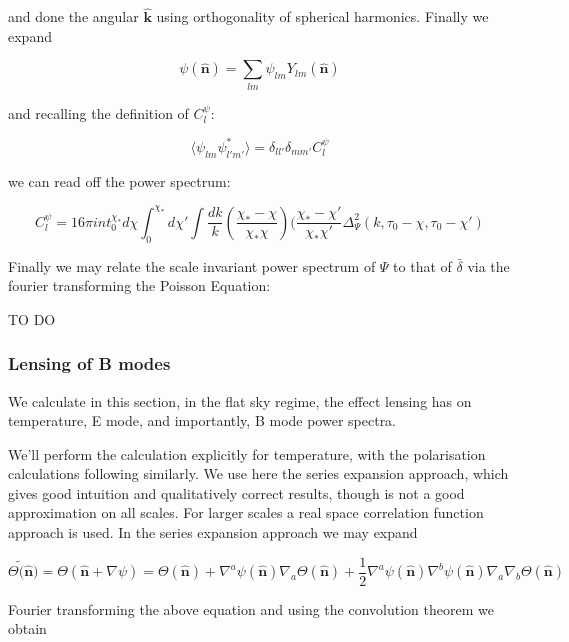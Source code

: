\documentclass[a4paper,10pt]{article}
\renewcommand{\v}[1]{\mathbf{#1}}
\newcommand{\half}{\frac{1}{2}}
\newcommand{\unit}[1]{\hat{\v{#1}}}
\begin{document}
and done the angular $\unit{k}$ using orthogonality of spherical harmonics. Finally we expand

\begin{equation}
\psi(\unit{n}) = \sum_{lm}\psi_{lm}Y_{lm}(\unit{n})
\end{equation}

and recalling the definition of $C_l^\psi$:

\begin{equation}
\langle \psi_{lm}\psi_{l'm'}^* \rangle = \delta_{ll'}\delta_{mm'}C_l^\psi
\end{equation}

we can read off the power spectrum:

\begin{equation}
C_l^\psi = 16\pi int_0^{\chi_*} d\chi \int_0^{\chi_*} d\chi' \int \frac{dk}{k} (\frac{\chi_*-\chi}{\chi_*\chi})(\frac{\chi_*-\chi'}{\chi_*\chi'}\Delta^2_\Psi(k, \tau_0-\chi, \tau_0-\chi')
\end{equation}

Finally we may relate the scale invariant power spectrum of $\Psi$ to that of $\bar{\delta}$ via the fourier transforming the Poisson Equation:

TO DO

\subsubsection{Lensing of B modes} 

We calculate in this section, in the flat sky regime, the effect lensing has on temperature, E mode, and importantly, B mode power spectra. 

We'll perform the calculation explicitly for temperature, with the polarisation calculations following similarly. We use here the series expansion approach, which gives good intuition and qualitatively correct results, though is not a good approximation on all scales. For larger scales a real space correlation function approach is used. In the series expansion approach we may expand

\begin{equation}
\tilde{\Theta(\unit{n}}) = \Theta(\unit{n}+\nabla\psi) =\Theta(\unit{n})+\nabla^a\psi(\unit{n})\nabla_a\Theta(\unit{n})+\half\nabla^a\psi(\unit{n})\nabla^b\psi(\unit{n})\nabla_a\nabla_b\Theta(\unit{n})
\end{equation}

Fourier transforming the above equation and using the convolution theorem we obtain
\end{document}
